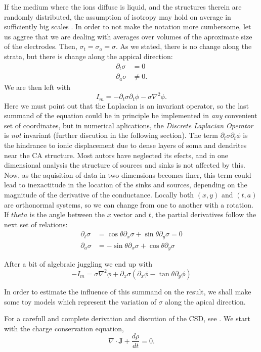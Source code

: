\documentclass{article}
\newcommand{\Jd}{\mathbf{J}}
\begin{document}
If the medium where the ions diffuse is liquid, and the structures
therein are randomly distributed, the assumption of isotropy may hold 
on average in sufficiently big scales \cite{Bedard11}. 
In order to not make the notation more cumbersome, let us aggree
that we are dealing with averages over volumes of the aproximate size
of the electrodes. Then, 
$\sigma_t=\sigma_a=\sigma$. As we stated, there is no
change along the strata, but there is change along the appical
direction:
\begin{align}
\partial_t \sigma & =0 \\
\partial_a \sigma & \neq 0. 
\end{align}
We are then left with
\begin{equation}
I_m=-\partial_t \sigma \partial_t \phi - \sigma \nabla^2 \phi.
\end{equation}
Here we must point out that the Laplacian is an invariant operator,
so the last summand of the equation could be in principle be implemented
in \emph{any} convenient set of coordinates, but in numerical aplications,
the \emph{Discrete Laplacian Operator} is \emph{not} invariant (further
discution in the following section). 
The term $\partial_t \sigma \partial_t \phi$ is the hindrance to 
ionic displacement due to dense layers of soma and dendrites near the
CA structure. Most autors have neglected its efects, and in one
dimensional analysis the structure of sources and sinks is not affected
by this. Now, as the aquisition of data in two dimensions becomes
finer, this term could lead to inexactitude in the location of the
sinks and sources, depending on the magnitude of the
derivative of the conductance. Locally both $(x,y)$ and
$(t,a)$ are orthonormal systems, so we can change from one to another 
with a rotation. If $theta$ is the angle between the $x$ vector
and $t$, the partial derivatives follow the next set of relations:
\begin{align}
\partial_t \sigma &= \cos\theta \partial_x \sigma +\sin\theta \partial_y \sigma=0\\
\partial_a \sigma &= -\sin\theta \partial_x \sigma +\cos\theta \partial_y \sigma
\end{align}

After a bit of algebraic juggling we end up with
\begin{equation}
-I_m=\sigma\nabla^2 \phi + 
\partial_x\sigma (\partial_x \phi - \tan \theta \partial_y \phi)
\end{equation} 


In order to estimate the influence
of this summand on the result, we shall make some toy models which
represent the variation of $\sigma$ along the apical direction.






For a carefull and complete derivation and discution of the CSD, 
see \cite{Bedard11}. We start with the charge conservation equation,
\begin{equation}
\nabla \cdot \Jd + \frac{d \rho}{d t} =0.
\end{equation}





\end{document}
